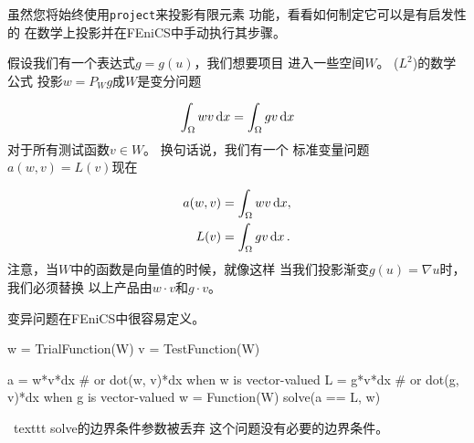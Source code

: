 \begin{notice}[手动投影。]
虽然您将始终使用\texttt{project}来投影有限元素
功能，看看如何制定它可以是有启发性的
在数学上投影并在FEniCS中手动执行其步骤。

假设我们有一个表达式$g = g(u)$，我们想要项目
进入一些空间$W$。 ($L^2$)的数学公式
投影$w = P_W g$成$W$是变分问题

\begin{equation}
  \int_{\Omega} w v \dx = \int_{\Omega} g v \dx
\end{equation}
对于所有测试函数$v\in W$。 换句话说，我们有一个
标准变量问题$a(w, v) = L(v)$现在

\begin{align}
a(w, v) &= \int_\Omega w v \dx,\\
L(v) &= \int_\Omega g v \dx\tp
\end{align}
注意，当$W$中的函数是向量值的时候，就像这样
当我们投影渐变$g(u) = \nabla u$时，我们必须替换
以上产品由$w\cdot v$和$g\cdot v$。

变异问题在FEniCS中很容易定义。
\begin{python}
w = TrialFunction(W)
v = TestFunction(W)

a = w*v*dx  # or dot(w, v)*dx when w is vector-valued
L = g*v*dx  # or dot(g, v)*dx when g is vector-valued
w = Function(W)
solve(a == L, w)
\end{python}
\ texttt {solve}的边界条件参数被丢弃
这个问题没有必要的边界条件。
\end{notice}
